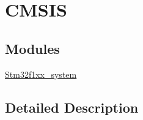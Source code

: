 \hypertarget{group___c_m_s_i_s}{}\section{C\+M\+S\+IS}
\label{group___c_m_s_i_s}
\subsection*{Modules}
\begin{DoxyCompactItemize}
\item 
\mbox{\hyperlink{group__stm32f1xx__system}{Stm32f1xx\+\_\+system}}
\end{DoxyCompactItemize}


\subsection{Detailed Description}
